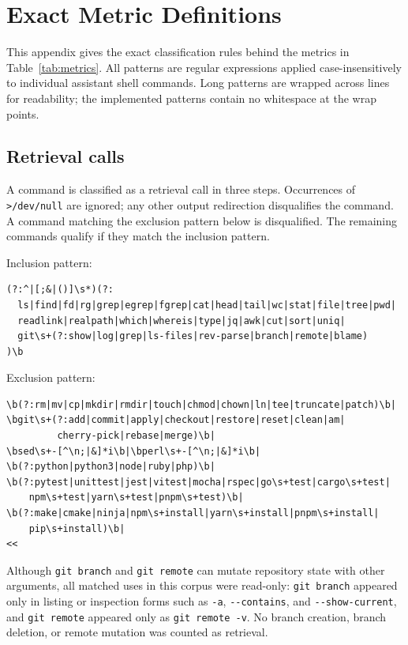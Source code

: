 \section{Exact Metric Definitions}
\label{app:metrics}

This appendix gives the exact classification rules behind the metrics in Table~\ref{tab:metrics}. All patterns are regular expressions applied case-insensitively to individual assistant shell commands. Long patterns are wrapped across lines for readability; the implemented patterns contain no whitespace at the wrap points.

\subsection{Retrieval calls}
\label{app:retrieval}

A command is classified as a retrieval call in three steps. Occurrences of \verb!>/dev/null! are ignored; any other output redirection disqualifies the command. A command matching the exclusion pattern below is disqualified. The remaining commands qualify if they match the inclusion pattern.

Inclusion pattern:

\begin{verbatim}
(?:^|[;&|()]\s*)(?:
  ls|find|fd|rg|grep|egrep|fgrep|cat|head|tail|wc|stat|file|tree|pwd|
  readlink|realpath|which|whereis|type|jq|awk|cut|sort|uniq|
  git\s+(?:show|log|grep|ls-files|rev-parse|branch|remote|blame)
)\b
\end{verbatim}

Exclusion pattern:

\begin{verbatim}
\b(?:rm|mv|cp|mkdir|rmdir|touch|chmod|chown|ln|tee|truncate|patch)\b|
\bgit\s+(?:add|commit|apply|checkout|restore|reset|clean|am|
         cherry-pick|rebase|merge)\b|
\bsed\s+-[^\n;|&]*i\b|\bperl\s+-[^\n;|&]*i\b|
\b(?:python|python3|node|ruby|php)\b|
\b(?:pytest|unittest|jest|vitest|mocha|rspec|go\s+test|cargo\s+test|
    npm\s+test|yarn\s+test|pnpm\s+test)\b|
\b(?:make|cmake|ninja|npm\s+install|yarn\s+install|pnpm\s+install|
    pip\s+install)\b|
<<
\end{verbatim}

Although \texttt{git branch} and \texttt{git remote} can mutate repository state with other arguments, all matched uses in this corpus were read-only: \texttt{git branch} appeared only in listing or inspection forms such as \verb!-a!, \verb!--contains!, and \verb!--show-current!, and \texttt{git remote} appeared only as \verb!git remote -v!. No branch creation, branch deletion, or remote mutation was counted as retrieval.

